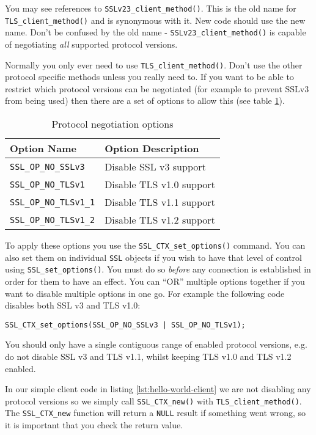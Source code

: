 You may see references to \verb!SSLv23_client_method()!. This is the old 
name for \verb!TLS_client_method()! and is synonymous with it. New code 
should use the new name. Don't be confused by the old name - 
\verb!SSLv23_client_method()! is capable of negotiating \emph{all} 
supported protocol versions.

Normally you only ever need to use \verb!TLS_client_method()!. Don't use 
the other protocol specific methods unless you really need to. If you want to 
be able to restrict which protocol versions can be negotiated (for example to 
prevent SSLv3 from being used) then there are a set of options to allow this 
(see table \ref{tab:protocol-opts}).

\begin{table}[tb]
\centering
\begin{tabular}{|l|l|}
\hline
\rowcolor{LightGray}
Option Name & Option Description \\
\hline
\verb!SSL_OP_NO_SSLv3! & Disable SSL v3 support \\
\hline
\verb!SSL_OP_NO_TLSv1! & Disable TLS v1.0 support \\
\hline
\verb!SSL_OP_NO_TLSv1_1! & Disable TLS v1.1 support \\
\hline
\verb!SSL_OP_NO_TLSv1_2! & Disable TLS v1.2 support \\
\hline
\end{tabular}
\caption{Protocol negotiation options}
\label{tab:protocol-opts}
\end{table}

To apply these options you use the \verb!SSL_CTX_set_options()! command. You 
can also set them on individual \verb!SSL! objects if you wish to have that 
level of control using \verb!SSL_set_options()!. You must do so \emph{before} 
any connection is established in order for them to have an effect. You can 
``OR'' multiple options together if you want to disable multiple options in one 
go. For example the following code disables both SSL v3 and TLS v1.0:
\begin{lstlisting}
SSL_CTX_set_options(SSL_OP_NO_SSLv3 | SSL_OP_NO_TLSv1);
\end{lstlisting}

You should only have a single contiguous range of enabled protocol versions, 
e.g. do not disable SSL v3 and TLS v1.1, whilst keeping TLS v1.0 and TLS v1.2 
enabled.

In our simple client code in listing \ref{lst:hello-world-client} we are not
disabling any protocol versions so we simply call \verb!SSL_CTX_new()! with
\verb!TLS_client_method()!. The \verb!SSL_CTX_new! function will return a
\verb!NULL! result if something went wrong, so it is important that you check
the return value.

